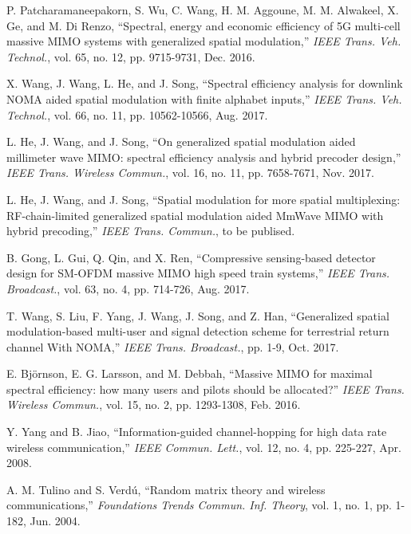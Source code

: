 \documentclass[journal]{IEEEtran}
\begin{document}
\begin{thebibliography}{1}
P. Patcharamaneepakorn, S. Wu, C. Wang, H. M. Aggoune, M. M. Alwakeel, X. Ge, and M. Di Renzo, ``Spectral, energy and economic efficiency of 5G multi-cell massive MIMO systems with generalized spatial modulation,'' \emph{IEEE Trans. Veh. Technol.}, vol. 65, no. 12, pp. 9715-9731, Dec. 2016.

X. Wang, J. Wang, L. He, and J. Song, ``Spectral efficiency analysis for downlink NOMA aided spatial modulation with finite alphabet inputs,'' \emph{IEEE Trans. Veh. Technol.}, vol. 66, no. 11, pp. 10562-10566, Aug. 2017.

L. He, J. Wang, and J. Song, ``On generalized spatial modulation aided millimeter wave MIMO: spectral efficiency analysis and hybrid precoder design,'' \emph{IEEE Trans. Wireless Commun.}, vol. 16, no. 11, pp. 7658-7671, Nov. 2017.

L. He, J. Wang, and J. Song, ``Spatial modulation for more spatial multiplexing: RF-chain-limited generalized spatial modulation aided MmWave MIMO with hybrid precoding,'' \emph{IEEE Trans. Commun.}, to be publised.


B. Gong, L. Gui, Q. Qin, and X. Ren, ``Compressive sensing-based detector design for SM-OFDM massive MIMO high speed train systems,'' \emph{IEEE Trans. Broadcast.}, vol. 63, no. 4, pp. 714-726, Aug. 2017.

T. Wang, S. Liu, F. Yang, J. Wang, J. Song, and Z. Han, ``Generalized spatial modulation-based multi-user and signal detection scheme for terrestrial return channel With NOMA,'' \emph{IEEE Trans. Broadcast.}, pp. 1-9, Oct. 2017.

E. Bj\"{o}rnson, E. G. Larsson, and M. Debbah, ``Massive MIMO for maximal spectral efficiency: how many users and pilots should be allocated?'' \emph{IEEE Trans. Wireless Commun.}, vol. 15, no. 2, pp. 1293-1308, Feb. 2016.

Y. Yang and B. Jiao, ``Information-guided channel-hopping for high data rate wireless communication,'' \textit{IEEE Commun. Lett.}, vol. 12, no. 4, pp. 225-227, Apr. 2008.

A. M. Tulino and S. Verd\'{u}, ``Random matrix theory and wireless communications,'' \emph{Foundations Trends Commun. Inf. Theory}, vol. 1, no. 1, pp. 1-182, Jun. 2004.

\end{thebibliography}
\end{document}
